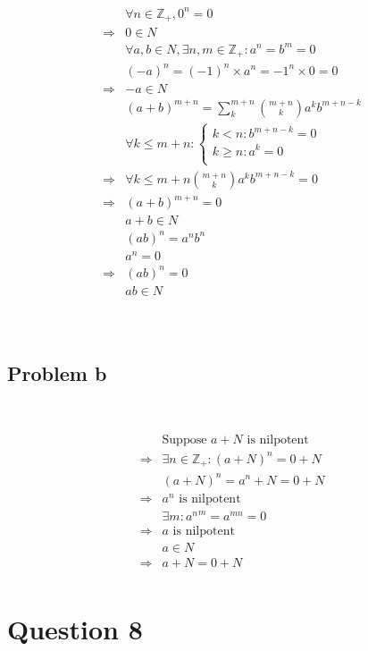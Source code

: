 \documentclass{article}
\begin{document}
\begin{align*}
    &\forall n\in \mathbb{Z}_+,0^n=0\\
    \Rightarrow&0\in N\\
    &\forall a,b\in N,\exists n,m\in \mathbb{Z} _+:a^n=b^m=0\\
    &(-a)^n=(-1)^n\times a^n=-1^n\times0=0\\
    \Rightarrow&-a\in N\\
    &(a+b)^{m+n}=\sum^{m+n}_{k}\binom{m+n}{k}a^kb^{m+n-k}\\
    &\forall k\leqslant m+n:\begin{cases}
        k<n:b^{m+n-k}=0\\
        k\geqslant n:a^k=0\\
    \end{cases}\\
    \Rightarrow&\forall k\leqslant m+n\binom{m+n}{k}a^kb^{m+n-k}=0\\
    \Rightarrow&(a+b)^{m+n}=0\\
    &a+b\in N\\
    &(ab)^n=a^nb^n\\
    &a^n=0\\
    \Rightarrow&(ab)^n=0\\
    &ab\in N\\
\end{align*}

~

\subsection*{Problem b}

~

\begin{align*}
    &\text{Suppose }a+N\text{ is nilpotent}\\
    \Rightarrow&\exists n\in \mathbb{Z} _+:(a+N)^n=0+N\\
    &(a+N)^n=a^n+N=0+N\\
    \Rightarrow&a^n\text{ is nilpotent}\\
    &\exists m:{a^n}^m=a^{mn}=0\\
    \Rightarrow&a\text{ is nilpotent}\\
    &a\in N\\
    \Rightarrow&a+N=0+N\\
\end{align*}

\newpage

\section*{Question 8}
\end{document}
